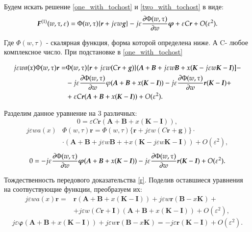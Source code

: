 Будем искать решение \eqref{one_with_tochost} и \eqref{two_with_tochost} в виде:
\begin{align}\label{zamena_phi}
	\boldsymbol{F}^{(1)}(w, \tau , \varepsilon) = \Phi (w, \tau)\{\boldsymbol{r}+j\varepsilon w \boldsymbol{g}\} 
	-j \varepsilon \pdv{\Phi (w, \tau)}{w}\boldsymbol{\varphi} + \varepsilon C \boldsymbol{r} + O(\varepsilon ^2).
\end{align}

Где \(\Phi (w, \tau)\) - скалярная функция, форма которой определена ниже. А C- любое комплексное число. При подстановке в \eqref{one_with_tochost}

\begin{align*}
	j \varepsilon w a(x) \Phi (w, \tau) \boldsymbol{r} =& \Phi (w, \tau) \{\boldsymbol{r} + j \varepsilon w (C\boldsymbol{r}+\boldsymbol{g})\} 
	(\boldsymbol{A}+\boldsymbol{B} + j\varepsilon w \boldsymbol{B}+x(\boldsymbol{K} - j \varepsilon w\boldsymbol{K}- \boldsymbol{I})]-\\
	&-j\varepsilon \pdv{\Phi (w, \tau)}{w}\varphi (\boldsymbol{A}+\boldsymbol{B} + x(\boldsymbol{K}-\boldsymbol{I}))
	-j\varepsilon \pdv{\Phi (w, \tau)}{w} \boldsymbol{r} (\boldsymbol{K} - \boldsymbol{I})+\\
	&+\varepsilon C \boldsymbol{r} ( \boldsymbol{A}+\boldsymbol{B}+x(\boldsymbol{K}-\boldsymbol{I})) + O(\varepsilon ^2).
\end{align*}

Разделим данное уравнение на 3 различных:
\[ 0 = \varepsilon C \boldsymbol{r}( \boldsymbol{A}+\boldsymbol{B}+x(\boldsymbol{K}-\boldsymbol{I})),\]
\begin{align*}
	j \varepsilon w a(x) &\Phi (w, \tau)\boldsymbol{r} = 
    \Phi (w, \tau) \{\boldsymbol{r} + j \varepsilon w (C\boldsymbol{r}+\boldsymbol{g})\}\cdot \\ 
	&\cdot (\boldsymbol{A}+\boldsymbol{B} + j\varepsilon w \boldsymbol{B}+
	+x(\boldsymbol{K} - j \varepsilon w\boldsymbol{K}- \boldsymbol{I})) + O(\varepsilon ^2),
\end{align*}
\[ 0 = -j\varepsilon \pdv{\Phi (w, \tau)}{w}\boldsymbol{\varphi} (\boldsymbol{A}+\boldsymbol{B} + x(\boldsymbol{K}-\boldsymbol{I}))
-j\varepsilon \pdv{\Phi (w, \tau)}{w} \boldsymbol{r} (\boldsymbol{K} - \boldsymbol{I})+ O(\varepsilon ^2).\]

Тождественность передового доказательства \eqref{r}. Поделив оставшиеся уравнения на соотвуствующие функции, преобразуем их:
\begin{align*}
	j \varepsilon w a(x)\boldsymbol{r}=&\boldsymbol{r}(\boldsymbol{A}+\boldsymbol{B} + x(\boldsymbol{K}-\boldsymbol{I}))+j \varepsilon w \boldsymbol{r}(\boldsymbol{B}-x\boldsymbol{K})+\\
	&+j \varepsilon w (C\boldsymbol{r}+\boldsymbol{I})(\boldsymbol{A}+\boldsymbol{B} + x(\boldsymbol{K}-\boldsymbol{I}))+ O(\varepsilon ^2),
\end{align*}
\[j\varepsilon\boldsymbol{\varphi}(\boldsymbol{A}+\boldsymbol{B} + x(\boldsymbol{K}-\boldsymbol{I}))+j \varepsilon w \boldsymbol{r}(\boldsymbol{B}-x\boldsymbol{K}) = -j\varepsilon\boldsymbol{r}(\boldsymbol{K}-\boldsymbol{I}) + O(\varepsilon ^2).\]

